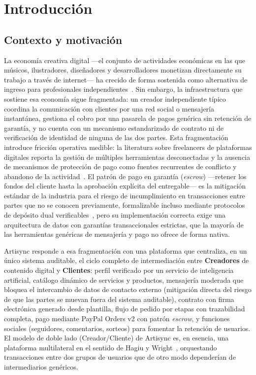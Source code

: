 
\chapter{Introducción}
\label{cap:introduccion}

\section{Contexto y motivación}

La economía creativa digital ---el conjunto de actividades económicas en
las que músicos, ilustradores, diseñadores y desarrolladores monetizan
directamente su trabajo a través de internet--- ha crecido de forma
sostenida como alternativa de ingreso para profesionales
independientes~\cite{PERES2024}. Sin embargo, la infraestructura que
sostiene esa economía sigue fragmentada: un creador independiente típico
coordina la comunicación con clientes por una red social o mensajería
instantánea, gestiona el cobro por una pasarela de pagos genérica sin
retención de garantía, y no cuenta con un mecanismo estandarizado de
contrato ni de verificación de identidad de ninguna de las dos partes.
Esta fragmentación introduce fricción operativa medible: la literatura
sobre freelancers de plataformas digitales reporta la gestión de múltiples
herramientas desconectadas y la ausencia de mecanismos de protección de
pago como fuentes recurrentes de conflicto y abandono de la
actividad~\cite{GUSSEK2023}. El patrón de pago en garantía (\emph{escrow})
---retener los fondos del cliente hasta la aprobación explícita del
entregable--- es la mitigación estándar de la industria para el riesgo de
incumplimiento en transacciones entre partes que no se conocen
previamente, formalizable incluso mediante protocolos de depósito dual
verificables~\cite{ASGAONKAR2019}, pero su implementación correcta exige
una arquitectura de datos con garantías transaccionales estrictas, que la
mayoría de las herramientas genéricas de mensajería y pago no ofrece de
forma nativa. 

Artisync responde a esa fragmentación con una plataforma que centraliza,
en un único sistema auditable, el ciclo completo de intermediación entre
\textbf{Creadores} de contenido digital y \textbf{Clientes}: perfil
verificado por un servicio de inteligencia artificial, catálogo dinámico
de servicios y productos, mensajería moderada que bloquea el intercambio
de datos de contacto externo (mitigación directa del riesgo de que las
partes se muevan fuera del sistema auditable), contrato con firma
electrónica generado desde plantilla, flujo de pedido por etapas con
trazabilidad completa, pago mediante PayPal Orders v2 con patrón
\emph{escrow}, y funciones sociales (seguidores, comentarios, sorteos)
para fomentar la retención de usuarios. El modelo de doble lado
(Creador/Cliente) de Artisync es, en esencia, una plataforma multilateral
en el sentido de Hagiu y Wright~\cite{HAGIU2015}, orquestando transacciones
entre dos grupos de usuarios que de otro modo dependerían de
intermediarios genéricos.

